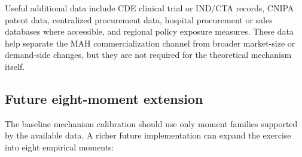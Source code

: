 \documentclass[12pt]{article}
\newcommand{\1}{\mathbf{1}}
\begin{document}
Useful additional data include CDE clinical trial or IND/CTA records, CNIPA patent data, centralized procurement data, hospital procurement or sales databases where accessible, and regional policy exposure measures. These data help separate the MAH commercialization channel from broader market-size or demand-side changes, but they are not required for the theoretical mechanism itself.

\subsection{Future eight-moment extension}

The baseline mechanism calibration should use only moment families supported by the available data. A richer future implementation can expand the exercise into eight empirical moments:
\end{document}
